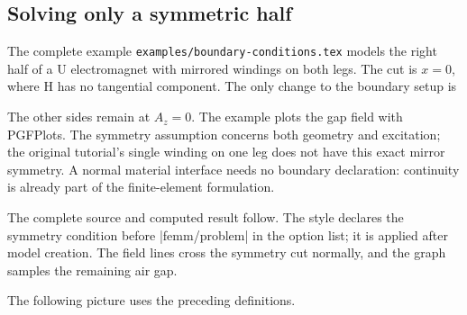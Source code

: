 \subsection{Solving only a symmetric half}
The complete example \texttt{examples/boundary-conditions.tex} models the
right half of a U electromagnet with mirrored windings on both legs.
The cut is $x=0$, where H has no tangential component. The only change to
the boundary setup is
\begin{codeexample}
\begin{tikzpicture}[femm/problem={
  xmin=0,xmax=85,ymin=-75,ymax=95,mesh size=4},
  femm/boundary={side=left,type=neumann}]
\end{tikzpicture}
\end{codeexample}
The other sides remain at $A_z=0$. The example plots the gap field with
PGFPlots. The symmetry assumption concerns both geometry and excitation;
the original tutorial's single winding on one leg does not have this
exact mirror symmetry. A normal material interface needs no boundary
declaration: continuity is already part of the finite-element formulation.

The complete source and computed result follow. The style declares the
symmetry condition before |femm/problem| in the option list; it is applied
after model creation. The field lines cross the symmetry cut normally,
and the graph samples the remaining air gap.


\begin{codeexample}
\end{codeexample}

The following picture uses the preceding definitions.


